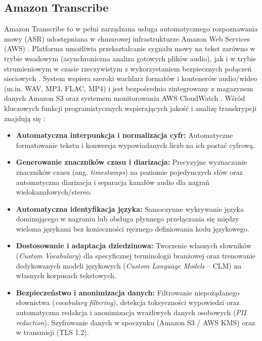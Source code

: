 \subsection{Amazon Transcribe}
Amazon Transcribe to w pełni zarządzana usługa automatycznego rozpoznawania mowy (ASR) udostępniana w chmurowej infrastrukturze Amazon Web Services (AWS) \cite{amazon_transcribe_features}. Platforma umożliwia przekształcanie sygnału mowy na tekst zarówno w trybie wsadowym (asynchroniczna analiza gotowych plików audio), jak i w trybie strumieniowym w czasie rzeczywistym z wykorzystaniem bezpiecznych połączeń sieciowych \cite{amazon_transcribe_features}. System wspiera szeroki wachlarz formatów i kontenerów audio/wideo (m.in. WAV, MP3, FLAC, MP4) i jest bezpośrednio zintegrowany z magazynem danych Amazon S3 oraz systemem monitorowania AWS CloudWatch \cite{amazon_transcribe_features}. Wśród kluczowych funkcji programistycznych wspierających jakość i analizę transkrypcji znajdują się \cite{amazon_transcribe_features}:
\begin{itemize}
\item \textbf{Automatyczna interpunkcja i normalizacja cyfr:} Automatyczne formatowanie tekstu i konwersja wypowiadanych liczb na ich postać cyfrową.
\item \textbf{Generowanie znaczników czasu i diarizacja:} Precyzyjne wyznaczanie znaczników czasu (ang. \textit{timestamps}) na poziomie pojedynczych słów oraz automatyczna diarizacja i separacja kanałów audio dla nagrań wielokanałowych/stereo.
\item \textbf{Automatyczna identyfikacja języka:} Samoczynne wykrywanie języka dominującego w nagraniu lub obsługa płynnego przełączania się między wieloma językami bez konieczności ręcznego definiowania kodu językowego.
\item \textbf{Dostosowanie i adaptacja dziedzinowa:} Tworzenie własnych słowników (\textit{Custom Vocabulary}) dla specyficznej terminologii branżowej oraz trenowanie dedykowanych modeli językowych (\textit{Custom Language Models} -- CLM) na własnych korpusach tekstowych.
\item \textbf{Bezpieczeństwo i anonimizacja danych:} Filtrowanie niepożądanego słownictwa (\textit{vocabulary filtering}), detekcja toksyczności wypowiedzi oraz automatyczna redakcja i anonimizacja wrażliwych danych osobowych (\textit{PII redaction}). Szyfrowanie danych w spoczynku (Amazon S3 / AWS KMS) oraz w transmisji (TLS 1.2).
\end{itemize}
